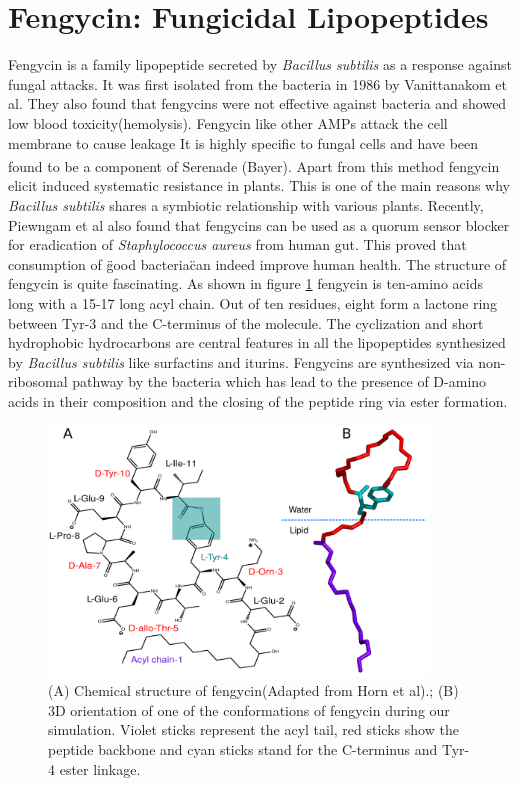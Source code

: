 \section{Fengycin: Fungicidal Lipopeptides}
Fengycin is a family lipopeptide secreted by \textit{Bacillus subtilis}
as a response against fungal attacks. 
It was first isolated from the bacteria in 1986 by Vanittanakom et al.\cite{Vanittanakom1986}
They also found that fengycins were not effective against bacteria and showed low blood toxicity(hemolysis).\cite{Vanittanakom1986}
Fengycin like other AMPs attack the cell membrane to cause leakage It is highly specific to fungal cells and have been found to be a component of Serenade \textsuperscript{\textregistered} (Bayer).
Apart from this method fengycin elicit induced systematic resistance in
plants. This is one of the main reasons why \textit{Bacillus subtilis} shares a symbiotic relationship with various plants. 
Recently, Piewngam et al also found that fengycins can be used as a quorum sensor blocker for eradication of \textit{Staphylococcus aureus} from human gut.\cite{Otto2018}
This proved that consumption of \"good bacteria\" can indeed improve human health.
The structure of fengycin is quite fascinating. As shown in figure \ref{fig:ch2_chemical_str} fengycin is ten-amino acids long with a 15-17 long acyl chain. Out of ten residues, eight form a lactone ring between Tyr-3 and the C-terminus of the molecule. The cyclization and short hydrophobic hydrocarbons are central features in all the lipopeptides synthesized by \textit{Bacillus subtilis} like surfactins and iturins. \cite{Jacques2007} Fengycins are synthesized via non-ribosomal pathway by the bacteria
which has lead to the presence of D-amino acids in their composition and the closing of the peptide ring via ester formation. \cite{Jacques1999}
\begin{figure}
\includegraphics[width=0.9\textwidth]{chapter2_figs/structure.pdf}
\caption{\label{fig:ch2_chemical_str} (A) Chemical
structure of fengycin(Adapted from Horn et al).\cite{Liu2007,HornGrossfield2013};
 (B) 3D orientation of one of the
conformations of fengycin during our simulation.
Violet sticks represent the acyl tail, red sticks
show the peptide backbone and cyan sticks stand for
the C-terminus and Tyr-4 ester linkage.}
\end{figure}

